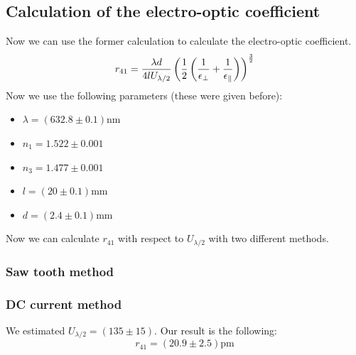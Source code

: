 \subsection{Calculation of the electro-optic coefficient}
Now we can use the former calculation to calculate the electro-optic coefficient.
\begin{equation}
    r_{41} = \frac{\lambda d}{4 l U_{\lambda / 2}} 
    \left(\frac{1}{2} \left(\frac{1}{\epsilon_\perp} + \frac{1}{\epsilon_\parallel}\right)\right)^{\frac{3}{2}}
    \label{eq:r_41_U}
\end{equation}
Now we use the following parameters (these were given before):
\begin{itemize}
\setlength\itemsep{0em}
\item[] $\lambda = (632.8\pm 0.1)$nm
\item[] $n_1     = 1.522\pm 0.001$
\item[] $n_3     = 1.477\pm 0.001$
\item[] $l       = ( 20\pm 0.1)$mm
\item[] $d       = (2.4\pm 0.1)$mm
\end{itemize}
Now we can calculate $r_{41}$ with respect to $U_{\lambda/2}$ with two different methods.
\subsubsection{Saw tooth method}
\label{ssub:Saw tooth method}

\subsubsection{DC current method}
\label{ssub:DC current method}
We estimated $U_{\lambda/2}    = (135  \pm 15)$.
Our result is the following: 
\begin{equation*}
r_{41} = \left (20.9 \pm 2.5 \right )  \mathrm{pm}
\end{equation*}
